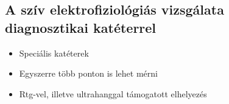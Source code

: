 \subsection{A szív elektrofiziológiás vizsgálata diagnosztikai katéterrel}
\begin{itemize}
    \item Speciális katéterek
    \item Egyszerre több ponton is lehet mérni
    \item Rtg-vel, illetve ultrahanggal támogatott
    elhelyezés
\end{itemize}